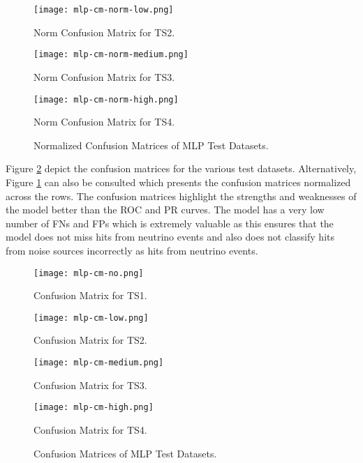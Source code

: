 \begin{figure}[htb]
  \centering
  \begin{minipage}{0.32\textwidth}
    \centering
    \texttt{[image: mlp-cm-norm-low.png]}
    \caption{Norm Confusion Matrix for TS2.}
  \end{minipage}
  \begin{minipage}{0.32\textwidth}
    \centering
    \texttt{[image: mlp-cm-norm-medium.png]}
    \caption{Norm Confusion Matrix for TS3.}
  \end{minipage}
  \begin{minipage}{0.32\textwidth}
    \centering
    \texttt{[image: mlp-cm-norm-high.png]}
    \caption{Norm Confusion Matrix for TS4.}
  \end{minipage}
  \caption{Normalized Confusion Matrices of MLP Test Datasets.}
  \label{fig:mlp-cm-norm}
\end{figure}

Figure \ref{fig:mlp-cm} depict the confusion matrices for the various
test datasets. Alternatively, Figure \ref{fig:mlp-cm-norm} can also be
consulted which presents the confusion matrices normalized across the
rows. The confusion matrices highlight the strengths and weaknesses of
the model better than the ROC and PR curves. The model has a very low
number of FNs and FPs which is extremely valuable as this ensures that
the model does not miss hits from neutrino events and also does not
classify hits from noise sources incorrectly as hits from neutrino
events.

\begin{figure}[htb]
  \centering
  \begin{minipage}{0.49\textwidth}
    \centering
    \texttt{[image: mlp-cm-no.png]}
    \caption{Confusion Matrix for TS1.}
    \label{fig:mlp-cm-no}
  \end{minipage}
  \begin{minipage}{0.49\textwidth}
    \centering
    \texttt{[image: mlp-cm-low.png]}
    \caption{Confusion Matrix for TS2.}
    \label{fig:mlp-cm-low}
  \end{minipage}
  \begin{minipage}{0.49\textwidth}
    \centering
    \texttt{[image: mlp-cm-medium.png]}
    \caption{Confusion Matrix for TS3.}
    \label{fig:mlp-cm-medium}
  \end{minipage}
  \begin{minipage}{0.49\textwidth}
    \centering
    \texttt{[image: mlp-cm-high.png]}
    \caption{Confusion Matrix for TS4.}
    \label{fig:mlp-cm-high}
  \end{minipage}
  \caption{Confusion Matrices of MLP Test Datasets.}
  \label{fig:mlp-cm}
\end{figure}

